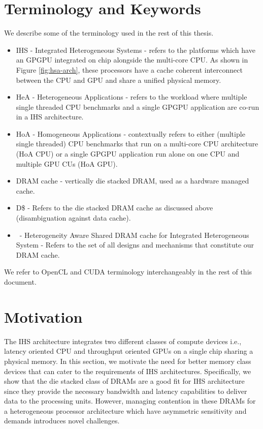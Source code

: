 \section{Terminology and Keywords}
We describe some of the terminology used in the rest of this thesis.
\begin{itemize}
	\item IHS - Integrated Heterogeneous Systems - refers to the platforms which have an GPGPU integrated on chip alongside the multi-core CPU. As shown in Figure \ref{fig:hsa-arch}, these processors have a cache coherent interconnect between the CPU and GPU and share a unified physical memory.
	\item HeA - Heterogeneous Applications - refers to the workload where multiple single threaded CPU benchmarks and a single GPGPU application are co-run in a IHS architecture.
	\item HoA - Homogeneous Applications - contextually refers to either (multiple single threaded) CPU benchmarks that run on a multi-core CPU architecture (HoA CPU) or a single GPGPU application run alone on one CPU and multiple GPU CUs (HoA GPU).
	\item DRAM cache - vertically die stacked DRAM, used as a hardware managed cache.
	\item D\$ - Refers to the die stacked DRAM cache as discussed above (disambiguation against data cache).
	\item \cachename\ - Heterogeneity Aware Shared DRAM cache for Integrated Heterogeneous System - Refers to the set of all designs and mechanisms that constitute our DRAM cache.
\end{itemize}
We refer to OpenCL \cite{opencl} and CUDA \cite{cuda} terminology interchangeably in the rest of this document.



\section{Motivation} \label{motivation}
The IHS architecture integrates two different classes of compute devices i.e., latency oriented CPU and throughput oriented GPUs on a single chip sharing a physical memory. In this section, we motivate the need for better memory class devices that can cater to the requirements of IHS architectures. Specifically, we show that the die stacked class of DRAMs are a good fit for IHS architecture since they provide the necessary bandwidth and latency capabilities to deliver data to the processing units. However, managing contention in these DRAMs for a heterogeneous processor architecture which have asymmetric sensitivity and demands introduces novel challenges.

